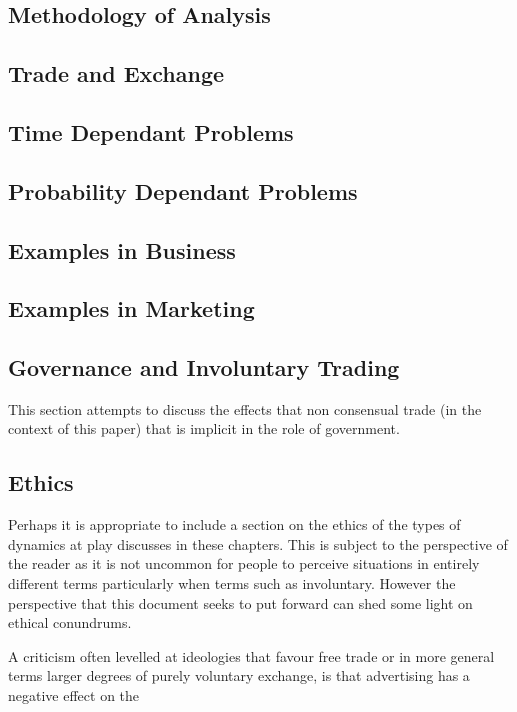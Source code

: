 \documentclass[]{article}
\begin{document}
\subsection{Methodology of Analysis}

\subsection{Trade and Exchange}

\subsection{Time Dependant Problems}

\subsection{Probability Dependant Problems}

\subsection{Examples in Business}

\subsection{Examples in Marketing}

\subsection{Governance and Involuntary Trading}
This section attempts to discuss the effects that non consensual trade (in the context of this paper) that is implicit in the role of government.

\subsection{Ethics}
Perhaps it is appropriate to include a section on the ethics of the types of dynamics at play discusses in these chapters. This is subject to the perspective of the reader as it is not uncommon for people to perceive situations in entirely different terms particularly when terms such as involuntary. However the perspective that this document seeks to put forward can shed some light on ethical conundrums. 

A criticism often levelled at ideologies that favour free trade or in more general terms larger degrees of purely voluntary exchange, is that advertising has a negative effect on the 
\end{document}
